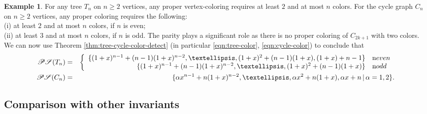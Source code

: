 \documentclass[10pt, reqno]{amsart}
\newcommand{\hf}{\hspace*{0.5cm}}
\theoremstyle{plain}
\theoremstyle{remark}
\theoremstyle{definition}
\newtheorem{eg}[theorem]{Example}
\numberwithin{equation}{section}
\begin{document}
\begin{eg}\label{eg:cycle-tree-PS}
For any tree $T_n$ on $n\geq 2$ vertices, any proper vertex-coloring requires at least $2$ and at most $n$ colors. For the cycle graph $C_n$ on $n\geq 2$ vertices, any proper coloring requires the following:\\
\hf (i) at least $2$ and at most $n$ colors, if $n$ is even;\\
\hf (ii) at least $3$ and at most $n$ colors, if $n$ is odd.
The parity plays a significant role as there is no proper coloring of $C_{2k+1}$ with two colors. We can now use Theorem \ref{thm:tree-cycle-color-detect} (in particular \eqref{eqn:tree-color}, \eqref{eqn:cycle-color}) to conclude that
\begin{eqnarray*}
    \mathscr{PS}(T_n) & = & \left\{\begin{array}{rl}
    \{(1+x)^{n-1}+(n-1)(1+x)^{n-2},\ldots,(1+x)^2+(n-1)(1+x),(1+x)+n-1\} & \textup{$n$ even}\\
    \{(1+x)^{n-1}+(n-1)(1+x)^{n-2},\ldots,(1+x)^2+(n-1)(1+x)\} & \textup{$n$ odd}\\
    \end{array}\right.\\
    \mathscr{PS}(C_n) & = & \{\alpha x^{n-1}+n(1+x)^{n-2},\ldots,\alpha x^2+n(1+x),\alpha x +n\,|\,\alpha=1,2\}.
\end{eqnarray*}
\end{eg}


\subsection{Comparison with other invariants}\label{subsec:Krushkal}
\end{document}
